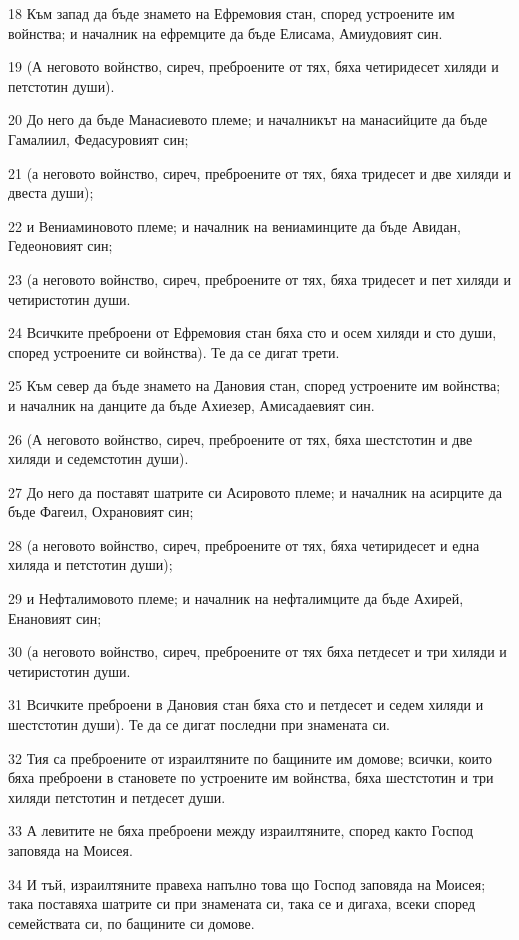 \par 18 Към запад да бъде знамето на Ефремовия стан, според устроените им войнства; и началник на ефремците да бъде Елисама, Амиудовият син.
\par 19 (А неговото войнство, сиреч, преброените от тях, бяха четиридесет хиляди и петстотин души).
\par 20 До него да бъде Манасиевото племе; и началникът на манасийците да бъде Гамалиил, Федасуровият син;
\par 21 (а неговото войнство, сиреч, преброените от тях, бяха тридесет и две хиляди и двеста души);
\par 22 и Вениаминовото племе; и началник на вениаминците да бъде Авидан, Гедеоновият син;
\par 23 (а неговото войнство, сиреч, преброените от тях, бяха тридесет и пет хиляди и четиристотин души.
\par 24 Всичките преброени от Ефремовия стан бяха сто и осем хиляди и сто души, според устроените си войнства). Те да се дигат трети.
\par 25 Към север да бъде знамето на Дановия стан, според устроените им войнства; и началник на данците да бъде Ахиезер, Амисадаевият син.
\par 26 (А неговото войнство, сиреч, преброените от тях, бяха шестстотин и две хиляди и седемстотин души).
\par 27 До него да поставят шатрите си Асировото племе; и началник на асирците да бъде Фагеил, Охрановият син;
\par 28 (а неговото войнство, сиреч, преброените от тях, бяха четиридесет и една хиляда и петстотин души);
\par 29 и Нефталимовото племе; и началник на нефталимците да бъде Ахирей, Енановият син;
\par 30 (а неговото войнство, сиреч, преброените от тях бяха петдесет и три хиляди и четиристотин души.
\par 31 Всичките преброени в Дановия стан бяха сто и петдесет и седем хиляди и шестстотин души). Те да се дигат последни при знамената си.
\par 32 Тия са преброените от израилтяните по бащините им домове; всички, които бяха преброени в становете по устроените им войнства, бяха шестстотин и три хиляди петстотин и петдесет души.
\par 33 А левитите не бяха преброени между израилтяните, според както Господ заповяда на Моисея.
\par 34 И тъй, израилтяните правеха напълно това що Господ заповяда на Моисея; така поставяха шатрите си при знамената си, така се и дигаха, всеки според семействата си, по бащините си домове.


